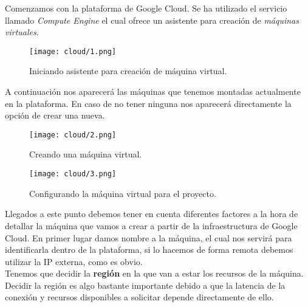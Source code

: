 \documentclass[11pt,fleqn]{book} %
\begin{document}
Comenzamos con la plataforma de Google Cloud. Se ha utilizado el servicio llamado \textit{Compute Engine} el cual ofrece un asistente para creación de \textit{máquinas virtuales}. \\

\begin{figure}[H]
	\centering\texttt{[image: cloud/1.png]}
	\caption{Iniciando asistente para creación de máquina virtual.}
	\label{fig:cloud1} %
\end{figure}

A continuación nos aparecerá las máquinas que tenemos montadas actualmente en la plataforma. En caso de no tener ninguna nos aparecerá directamente la opción de crear una nueva. \\

\begin{figure}[H]
	\centering\texttt{[image: cloud/2.png]}
	\caption{Creando una máquina virtual.}
	\label{fig:cloud2} %
\end{figure}

\begin{figure}[H]
	\centering\texttt{[image: cloud/3.png]}
	\caption{Configurando la máquina virtual para el proyecto.}
	\label{fig:cloud3} %
\end{figure}

Llegados a este punto debemos tener en cuenta diferentes factores a la hora de detallar la máquina que vamos a crear a partir de la infraestructura de Google Cloud. En primer lugar damos nombre a la máquina, el cual nos servirá para identificarla dentro de la plataforma, si lo hacemos de forma remota debemos utilizar la IP externa, como es obvio. \\

Tenemos que decidir la \textbf{región} en la que van a estar los recursos de la máquina. Decidir la región es algo bastante importante debido a que la latencia de la conexión y recursos disponibles a solicitar depende directamente de ello. \\
\end{document}

